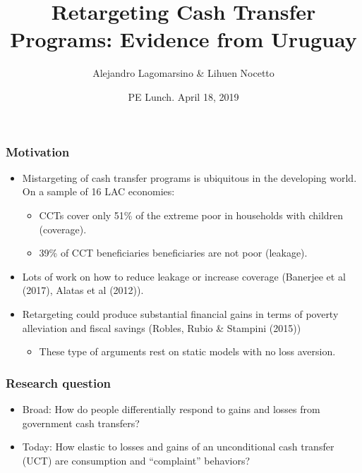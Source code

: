 \documentclass{beamer}
\title[Retargeting Cash Transfer Programs] %
{Retargeting Cash Transfer Programs: Evidence from Uruguay}
\author[Alejandro Lagomarsino] %
{Alejandro Lagomarsino \& Lihuen Nocetto\inst{*} }
\institute[] %
{
	\inst{*}%
	Harvard University\\
	Pontifical Catholic University of Chile
}
\date[PF/Labor Lunch - April 2019] %
{PE Lunch. April 18, 2019}
\begin{document}
	\setlength{\parindent}{10pt}
	
	\frame{\titlepage}

\begin{frame}
\frametitle{Motivation}
\begin{itemize}
	\item Mistargeting of cash transfer programs is ubiquitous in the developing world. On a sample of 16 LAC economies:
	\begin{itemize}
		\item CCTs cover only 51\% of the extreme poor in households with children (coverage).
		\item 39\% of CCT beneficiaries beneficiaries are not poor (leakage).

	\end{itemize}
	\item Lots of work on how to reduce leakage or increase coverage (Banerjee et al (2017), Alatas et al (2012)). 
	\item Retargeting could produce substantial financial gains in terms of poverty alleviation and fiscal savings (Robles, Rubio \& Stampini (2015))
	\begin{itemize}
		\item These type of arguments rest on static models with no loss aversion.
	\end{itemize}
\end{itemize}
\end{frame}

\begin{frame}
\frametitle{Research question}
\begin{itemize}
	\item Broad: How do people differentially respond to gains and losses from government cash transfers?
	\item Today: How elastic to losses and gains of an unconditional cash transfer (UCT) are consumption and ``complaint'' behaviors?
\end{itemize}
\end{frame}
\end{document}
